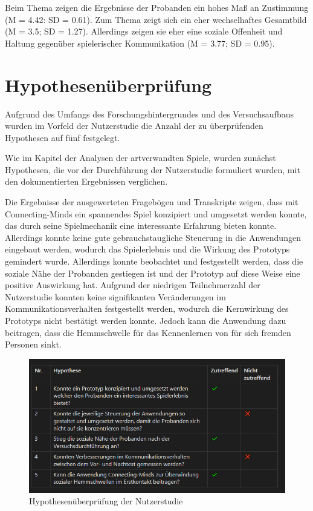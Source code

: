 Beim Thema  zeigen die Ergebnisse der Probanden ein hohes Maß an Zustimmung (M = 4.42: SD = 0.61). Zum Thema  zeigt sich ein eher wechselhaftes Gesamtbild (M = 3.5; SD = 1.27). Allerdings zeigen sie eher eine soziale Offenheit und Haltung gegenüber spielerischer Kommunikation (M = 3.77; SD = 0.95).

\section{Hypothesenüberprüfung}
Aufgrund des Umfangs des Forschungshintergrundes und des Versuchsaufbaus wurden im Vorfeld der Nutzerstudie die Anzahl der zu überprüfenden Hypothesen auf fünf festgelegt.

Wie im Kapitel der Analysen der artverwandten Spiele, wurden zunächst Hypothesen, die vor der Durchführung der Nutzerstudie formuliert wurden, mit den dokumentierten Ergebnissen verglichen. 

Die Ergebnisse der ausgewerteten Fragebögen und Transkripte zeigen, dass mit Connecting-Minds ein spannendes Spiel konzipiert und umgesetzt werden konnte, das durch seine Spielmechanik eine interessante Erfahrung bieten konnte. Allerdings konnte keine gute gebrauchstaugliche Steuerung in die Anwendungen eingebaut werden, wodurch das Spielerlebnis und die Wirkung des Prototyps gemindert wurde. Allerdings konnte beobachtet und festgestellt werden, dass die soziale Nähe der Probanden gestiegen ist und der Prototyp auf diese Weise eine positive Auswirkung hat. Aufgrund der niedrigen Teilnehmerzahl der Nutzerstudie konnten keine signifikanten Veränderungen im Kommunikationsverhalten festgestellt werden, wodurch die Kernwirkung des Prototyps nicht bestätigt werden konnte. Jedoch kann die Anwendung dazu beitragen, dass die Hemmschwelle für das Kennenlernen von für sich fremden Personen sinkt.

\begin{figure}[ht]
\centering
\includegraphics[width=1\linewidth]{content/pictures/Hypothesen_Nutzerstudie.PNG}
\caption{Hypothesenüberprüfung der Nutzerstudie}
\label{fig:hypothesis_user_study}
\end{figure}

